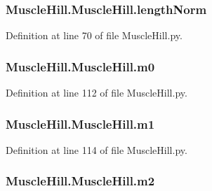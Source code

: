 \subsubsection[{\texorpdfstring{length\+Norm}{lengthNorm}}]{\setlength{\rightskip}{0pt plus 5cm}Muscle\+Hill.\+Muscle\+Hill.\+length\+Norm}\hypertarget{class_muscle_hill_1_1_muscle_hill_adabb54ae9958adea2ec9d22ac0c667ac}{}\label{class_muscle_hill_1_1_muscle_hill_adabb54ae9958adea2ec9d22ac0c667ac}


Definition at line 70 of file Muscle\+Hill.\+py.

\subsubsection[{\texorpdfstring{m0}{m0}}]{\setlength{\rightskip}{0pt plus 5cm}Muscle\+Hill.\+Muscle\+Hill.\+m0}\hypertarget{class_muscle_hill_1_1_muscle_hill_a971c1c9595bfe6364f779eec7f8d7f9b}{}\label{class_muscle_hill_1_1_muscle_hill_a971c1c9595bfe6364f779eec7f8d7f9b}


Definition at line 112 of file Muscle\+Hill.\+py.

\subsubsection[{\texorpdfstring{m1}{m1}}]{\setlength{\rightskip}{0pt plus 5cm}Muscle\+Hill.\+Muscle\+Hill.\+m1}\hypertarget{class_muscle_hill_1_1_muscle_hill_a2a7ec03b2d3290a4e29b2c6d32e5f7ba}{}\label{class_muscle_hill_1_1_muscle_hill_a2a7ec03b2d3290a4e29b2c6d32e5f7ba}


Definition at line 114 of file Muscle\+Hill.\+py.

\subsubsection[{\texorpdfstring{m2}{m2}}]{\setlength{\rightskip}{0pt plus 5cm}Muscle\+Hill.\+Muscle\+Hill.\+m2}\hypertarget{class_muscle_hill_1_1_muscle_hill_a31d135b0938cab341e7bbf069bd8a83f}{}\label{class_muscle_hill_1_1_muscle_hill_a31d135b0938cab341e7bbf069bd8a83f}


